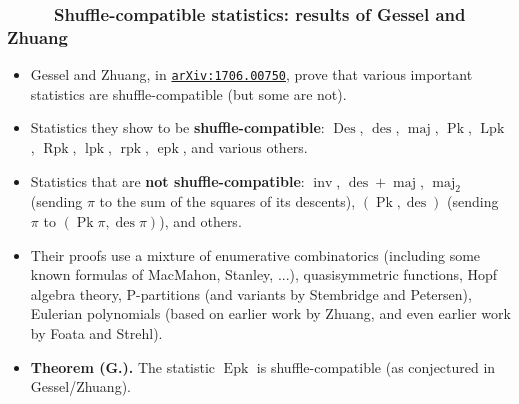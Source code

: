 \documentclass{beamer}
\newcommand{\red}{\color{red}}
\newcommand{\Lpk}{\operatorname{Lpk}}
\newcommand{\lpk}{\operatorname{lpk}}
\newcommand{\Rpk}{\operatorname{Rpk}}
\newcommand{\rpk}{\operatorname{rpk}}
\newcommand{\Pk}{\operatorname{Pk}}
\newcommand{\Epk}{\operatorname{Epk}}
\newcommand{\epk}{\operatorname{epk}}
\newcommand{\Des}{\operatorname{Des}}
\newcommand{\des}{\operatorname{des}}
\newcommand{\maj}{\operatorname{maj}}
\newcommand\arxiv[1]{\href{http://www.arxiv.org/abs/#1}{\texttt{arXiv:#1}}}
\newcommand{\fti}[1]{\frametitle{\ \ \ \ \ #1}}
\newcommand{\tup}[1]{\left( #1 \right)}
\theoremstyle{plain}
\begin{document}
\begin{frame}
\fti{Shuffle-compatible statistics: results of Gessel and Zhuang}

\begin{itemize}

\item Gessel and Zhuang, in {\red \arxiv{1706.00750}}, prove that
      various important statistics are shuffle-compatible (but some
      are not).

\pause

\item Statistics they show to be \textbf{shuffle-compatible}: $\Des$, $\des$,
      $\maj$, $\Pk$, $\Lpk$, $\Rpk$, $\lpk$, $\rpk$, $\epk$,
      and various others.

\pause

\item Statistics that are \textbf{not shuffle-compatible}:
      $\operatorname{inv}$, $\des + \maj$, $\maj_2$ (sending $\pi$
      to the sum of the squares of its descents),
      $\tup{\Pk, \des}$ (sending $\pi$ to $\tup{\Pk\pi, \des\pi}$),
      and others.

\pause 

\item Their proofs use a mixture of enumerative combinatorics
      (including some known formulas of MacMahon, Stanley, ...),
      quasisymmetric functions, Hopf algebra theory,
      P-partitions (and variants by Stembridge and Petersen),
      Eulerian polynomials (based on earlier work by Zhuang,
      and even earlier work by Foata and Strehl).

\pause

\item \textbf{Theorem (G.).} The statistic $\Epk$ is
      shuffle-compatible (as conjectured in Gessel/Zhuang).

\end{itemize}

\end{frame}
\end{document}
